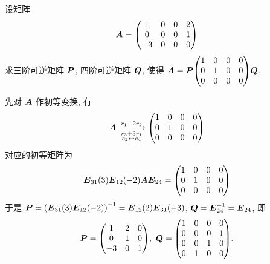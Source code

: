 \begin{example}
    设矩阵 $$\vb*{A}=\mqty(1&0&0&2\\0&0&0&1\\-3&0&0&0)$$
    求三阶可逆矩阵 $\vb*{P}$, 四阶可逆矩阵 $\vb*{Q}$, 使得 $\vb*{A}=\vb*{P}\mqty(1&0&0&0\\0&1&0&0\\0&0&0&0)\vb*{Q}.$
\end{example}
\begin{solution}
    先对 $\vb*{A}$ 作初等变换, 有
    $$\vb*{A}\xrightarrow[\substack{r_3+3r_1\\c_2\leftrightarrow c_4}]{r_1-2r_2}\mqty(1&0&0&0\\0&1&0&0\\0&0&0&0)$$
    对应的初等矩阵为
    $$\vb*{E}_{31}(3)\vb*{E}_{12}(-2)\vb*{AE}_{24}=\mqty(1&0&0&0\\0&1&0&0\\0&0&0&0)$$
    于是 $\vb*{P}=\qty(\vb*{E}_{31}(3)\vb*{E}_{12}(-2))^{-1}=\vb*{E}_{12}(2)\vb*{E}_{31}(-3)$, $\vb*{Q}=\vb*{E}_{24}^{-1}=\vb*{E}_{24}$, 即
    $$\vb*{P}=\mqty(1&2&0\\0&1&0\\-3&0&1),~\vb*{Q}=\mqty(1&0&0&0\\0&0&0&1\\0&0&1&0\\0&1&0&0).$$
\end{solution}


